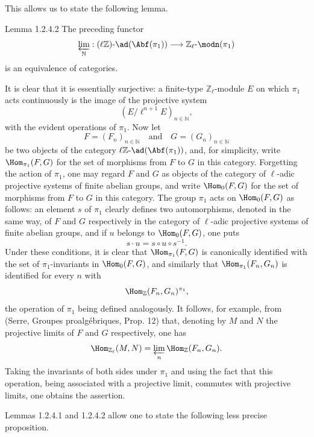 This allows us to state the following lemma.

\begin{statement}{Lemma 1.2.4.2}
The preceding functor
\[
\varprojlim_{\mathbb N}:(\ell\mathbb Z)\text{-}\ad(\Abf(\pi_1))
\longrightarrow \mathbb Z_\ell\text{-}\modn(\pi_1)
\]
is an equivalence of categories.
\end{statement}

\begin{prooftext}[Proof]
It is clear that it is essentially surjective: a finite-type \(\mathbb Z_\ell\)-module \(E\) on which \(\pi_1\) acts continuously is the image of the projective system
\[
(E/\ell^{n+1}E)_{n\in\mathbb N},
\]
with the evident operations of \(\pi_1\). Now let
\[
F=(F_n)_{n\in\mathbb N}\quad\text{and}\quad G=(G_n)_{n\in\mathbb N}
\]
be two objects of the category \(\ell\mathbb Z\text{-}\ad(\Abf(\pi_1))\), and, for simplicity, write \(\Hom_{\pi_1}(F,G)\) for the set of morphisms from \(F\) to \(G\) in this category. Forgetting the action of \(\pi_1\), one may regard \(F\) and \(G\) as objects of the category of \(\ell\)-adic projective systems of finite abelian groups, and write \(\Hom_0(F,G)\) for the set of morphisms from \(F\) to \(G\) in this category. The group \(\pi_1\) acts on \(\Hom_0(F,G)\) as follows: an element \(s\) of \(\pi_1\) clearly defines two automorphisms, denoted in the same way, of \(F\) and \(G\) respectively in the category of \(\ell\)-adic projective systems of finite abelian groups, and if \(u\) belongs to \(\Hom_0(F,G)\), one puts
\[
s\cdot u=s\circ u\circ s^{-1}.
\]
Under these conditions, it is clear that \(\Hom_{\pi_1}(F,G)\) is canonically identified with the set of \(\pi_1\)-invariants in \(\Hom_0(F,G)\), and similarly that \(\Hom_{\pi_1}(F_n,G_n)\) is identified for every \(n\) with
\[
\Hom_{\mathbb Z}(F_n,G_n)^{\pi_1},
\]
the operation of \(\pi_1\) being defined analogously. It follows, for example, from (Serre, Groupes proalgébriques, Prop. 12) that, denoting by \(M\) and \(N\) the projective limits of \(F\) and \(G\) respectively, one has
\[
\Hom_{\mathbb Z_\ell}(M,N)=\varprojlim_n\Hom_{\mathbb Z}(F_n,G_n).
\]
Taking the invariants of both sides under \(\pi_1\) and using the fact that this operation, being associated with a projective limit, commutes with projective limits, one obtains the assertion.
\end{prooftext}

Lemmas 1.2.4.1 and 1.2.4.2 allow one to state the following less precise proposition.

